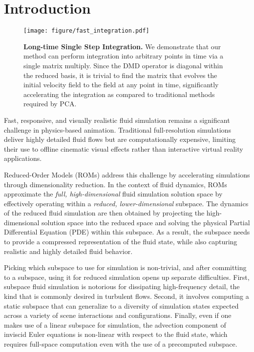 \section{Introduction}
\label{sec:introduction}

\begin{figure*}[!ht]
    \centering
    \texttt{[image: figure/fast\_integration.pdf]}
    \caption{\textbf{Long-time Single Step Integration.} We demonstrate that our method can perform integration into arbitrary points in time via a single matrix multiply. Since the DMD operator is diagonal within the reduced basis, it is trivial to find the matrix that evolves the initial velocity field to the field at any point in time, significantly accelerating the integration as compared to traditional methods required by PCA.}
    \label{fig:dmdadvectioncomparison}
    \Description{}
\end{figure*}

Fast, responsive, and visually realistic fluid simulation remains a significant challenge in physics-based animation.
Traditional full-resolution simulations deliver highly detailed fluid flows but are computationally expensive, limiting their use to offline cinematic visual effects rather than interactive virtual reality applications.
%

Reduced-Order Models (ROMs) address this challenge by accelerating simulations through dimensionality reduction.
%
In the context of fluid dynamics, ROMs approximate the \emph{full, high-dimensional} fluid simulation solution space by effectively operating within a \emph{reduced, lower-dimensional} subspace.
% 
The dynamics of the reduced fluid simulation are then obtained by projecting the high-dimensional solution space into the reduced space and solving the physical Partial Differential Equation (PDE) within this subspace.
%
As a result, the subspace needs to provide a compressed representation of the fluid state, while also capturing realistic and highly detailed fluid behavior.
%


Picking which subspace to use for simulation is non-trivial, and after committing to a subspace, using it for reduced simulation opens up separate difficulties. 
%
First, subspace fluid simulation is notorious for dissipating high-frequency detail, the kind that is commonly desired in turbulent flows. 
%
Second, it involves computing a static subspace that can generalize to a diversity of simulation states expected across a variety of scene interactions and configurations. 
%
Finally, even if one makes use of a linear subspace for simulation, the advection component of inviscid Euler equations is non-linear with respect to the fluid state, which requires full-space computation even with the use of a precomputed subspace. 


